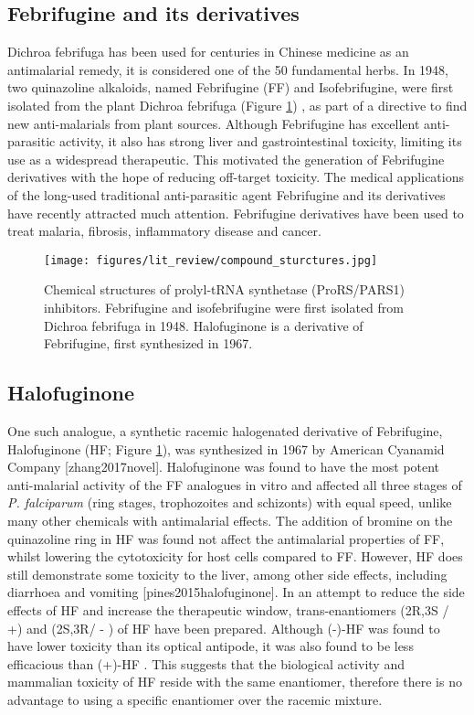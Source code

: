 \subsection{Febrifugine and its derivatives}
Dichroa febrifuga has been used for centuries in Chinese medicine as an antimalarial remedy, it is considered one of the 50 fundamental herbs.
In 1948, two quinazoline alkaloids, named Febrifugine (FF) and Isofebrifugine, were first isolated from the plant Dichroa febrifuga (Figure \ref{fig:FF_IF_HF}) \cite{koepfli1949alkaloids}, as part of a directive to find new anti-malarials from plant sources.
Although Febrifugine has excellent anti-parasitic activity, it also has strong liver and gastrointestinal toxicity, limiting its use as a widespread therapeutic.
This motivated the generation of Febrifugine derivatives with the hope of reducing off-target toxicity.
The medical applications of the long-used traditional anti-parasitic agent Febrifugine and its derivatives have recently attracted much attention.
Febrifugine derivatives have been used to treat malaria, fibrosis, inflammatory disease and cancer.

\begin{figure}[htb]
\centering
\texttt{[image: figures/lit\_review/compound\_sturctures.jpg]}
\caption[Prolyl-tRNA synthetase inhibitor chemical structures]{Chemical structures of prolyl-tRNA synthetase (ProRS/PARS1) inhibitors.
Febrifugine and isofebrifugine were first isolated from Dichroa febrifuga in 1948.
Halofuginone is a derivative of Febrifugine, first synthesized in 1967.
}
\label{fig:FF_IF_HF}\end{figure}

\subsection{Halofuginone}
One such analogue, a synthetic racemic halogenated derivative of Febrifugine, Halofuginone (HF; Figure \ref{fig:FF_IF_HF}), was synthesized in 1967 by American Cyanamid Company [zhang2017novel].
Halofuginone was found to have the most potent anti-malarial activity of the FF analogues in vitro and affected all three stages of \textit{P. falciparum} (ring stages, trophozoites and schizonts) with equal speed, unlike many other chemicals with antimalarial effects.
The addition of bromine on the quinazoline ring in HF was found not affect the antimalarial properties of FF, whilst lowering the cytotoxicity for host cells compared to FF.
However, HF does still demonstrate some toxicity to the liver, among other side effects, including diarrhoea and vomiting [pines2015halofuginone].
In an attempt to reduce the side effects of HF and increase the therapeutic window, trans-enantiomers (2R,3S / +)  and (2S,3R/ - ) of HF have been prepared.
Although (-)-HF was found to have lower toxicity than its optical antipode, it was also found to be less efficacious than (+)-HF \cite{mordechay2021differential, linder20072r}.
This suggests that the biological activity and mammalian toxicity of HF reside with the same enantiomer, therefore there is no advantage to using a specific enantiomer over the racemic mixture.

